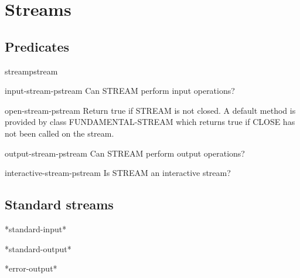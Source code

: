 \documentclass[10pt,english]{book}
\begin{document}


\chapter{Streams}
\label{cha:streams}

\section{Predicates}
\label{sec:stream-predicates}

\begin{function}{streamp}{stream}
  
\end{function}

\begin{function}{input-stream-p}{stream}
  Can STREAM perform input operations?
\end{function}

\begin{function}{open-stream-p}{stream}
  Return true if STREAM is not closed. A default method is provided
  by class FUNDAMENTAL-STREAM which returns true if CLOSE has not been
  called on the stream.
\end{function}

\begin{function}{output-stream-p}{stream}
  Can STREAM perform output operations?
\end{function}

\begin{function}{interactive-stream-p}{stream}
  Is STREAM an interactive stream?
\end{function}

\section{Standard streams}
\label{sec:standard-streams}

\begin{variable}{*standard-input*}{}
  
\end{variable}

\begin{variable}{*standard-output*}{}
  
\end{variable}

\begin{variable}{*error-output*}{}
  
\end{variable}
\end{document}
